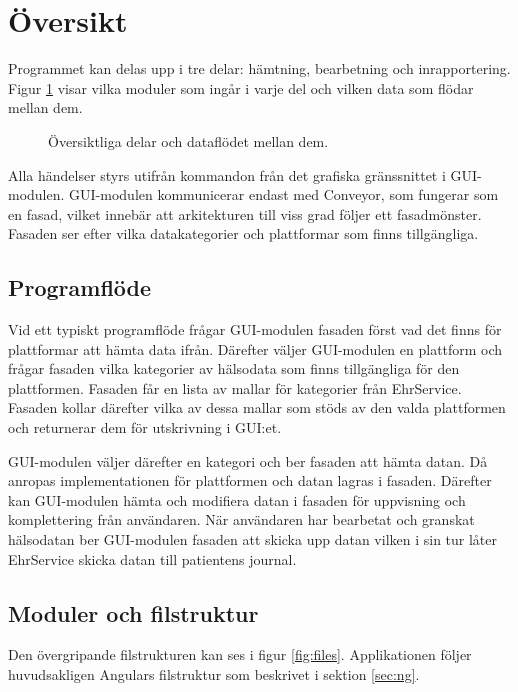 \documentclass[techdoc/techdoc.tex]{subfiles}
\begin{document}
\section{Översikt} \label{sec:3_overview}
Programmet kan delas upp i tre delar: hämtning, bearbetning och inrapportering.
Figur \ref{fig:arch} visar vilka moduler som ingår i varje del och vilken data
som flödar mellan dem.

\begin{figure}[H]
    \centering
    
    \caption[Översiktlig programarkitektur]{Översiktliga delar och dataflödet
    mellan dem.}
    \label{fig:arch}
\end{figure}

Alla händelser styrs utifrån kommandon från det grafiska gränssnittet i
GUI-modulen. GUI-modulen kommunicerar endast med Conveyor, som fungerar som en
fasad, vilket innebär att arkitekturen till viss grad följer ett fasadmönster.
Fasaden ser efter vilka datakategorier och plattformar som finns tillgängliga.

\subsection{Programflöde}
Vid ett typiskt programflöde frågar GUI-modulen fasaden först vad det finns för
plattformar att hämta data ifrån. Därefter väljer GUI-modulen en plattform och
frågar fasaden vilka kategorier av hälsodata som finns tillgängliga för den
plattformen. Fasaden får en lista av mallar för kategorier från EhrService.
Fasaden kollar därefter vilka av dessa mallar som stöds av den valda
plattformen och returnerar dem för utskrivning i GUI:et.

GUI-modulen väljer därefter en kategori och ber fasaden att hämta datan. Då
anropas implementationen för plattformen och datan lagras i fasaden. Därefter
kan GUI-modulen hämta och modifiera datan i fasaden för uppvisning och
komplettering från användaren. När användaren har bearbetat och granskat
hälsodatan ber GUI-modulen fasaden att skicka upp datan vilken i sin tur låter
EhrService skicka datan till patientens journal.

\subsection{Moduler och filstruktur}
Den övergripande filstrukturen kan ses i figur \ref{fig:files}. Applikationen
följer huvudsakligen Angulars filstruktur som beskrivet i sektion \ref{sec:ng}.
\end{document}
